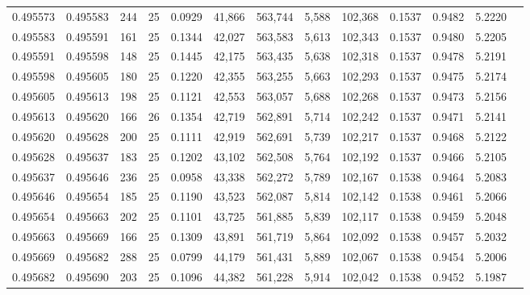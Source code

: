 \begin{tabular}{rrrrrrrrrrrrr}
0.495573 & 0.495583 & 244 &  25 &                                     0.0929 &  41,866 & 563,744 &   5,588 & 102,368 & 0.1537 & 0.9482 & 5.2220 \\
0.495583 & 0.495591 & 161 &  25 &                                     0.1344 &  42,027 & 563,583 &   5,613 & 102,343 & 0.1537 & 0.9480 & 5.2205 \\
0.495591 & 0.495598 & 148 &  25 &                                     0.1445 &  42,175 & 563,435 &   5,638 & 102,318 & 0.1537 & 0.9478 & 5.2191 \\
0.495598 & 0.495605 & 180 &  25 &                                     0.1220 &  42,355 & 563,255 &   5,663 & 102,293 & 0.1537 & 0.9475 & 5.2174 \\
0.495605 & 0.495613 & 198 &  25 &                                     0.1121 &  42,553 & 563,057 &   5,688 & 102,268 & 0.1537 & 0.9473 & 5.2156 \\
0.495613 & 0.495620 & 166 &  26 &                                     0.1354 &  42,719 & 562,891 &   5,714 & 102,242 & 0.1537 & 0.9471 & 5.2141 \\
0.495620 & 0.495628 & 200 &  25 &                                     0.1111 &  42,919 & 562,691 &   5,739 & 102,217 & 0.1537 & 0.9468 & 5.2122 \\
0.495628 & 0.495637 & 183 &  25 &                                     0.1202 &  43,102 & 562,508 &   5,764 & 102,192 & 0.1537 & 0.9466 & 5.2105 \\
0.495637 & 0.495646 & 236 &  25 &                                     0.0958 &  43,338 & 562,272 &   5,789 & 102,167 & 0.1538 & 0.9464 & 5.2083 \\
0.495646 & 0.495654 & 185 &  25 &                                     0.1190 &  43,523 & 562,087 &   5,814 & 102,142 & 0.1538 & 0.9461 & 5.2066 \\
0.495654 & 0.495663 & 202 &  25 &                                     0.1101 &  43,725 & 561,885 &   5,839 & 102,117 & 0.1538 & 0.9459 & 5.2048 \\
0.495663 & 0.495669 & 166 &  25 &                                     0.1309 &  43,891 & 561,719 &   5,864 & 102,092 & 0.1538 & 0.9457 & 5.2032 \\
0.495669 & 0.495682 & 288 &  25 &                                     0.0799 &  44,179 & 561,431 &   5,889 & 102,067 & 0.1538 & 0.9454 & 5.2006 \\
0.495682 & 0.495690 & 203 &  25 &                                     0.1096 &  44,382 & 561,228 &   5,914 & 102,042 & 0.1538 & 0.9452 & 5.1987 \\

\end{tabular}
